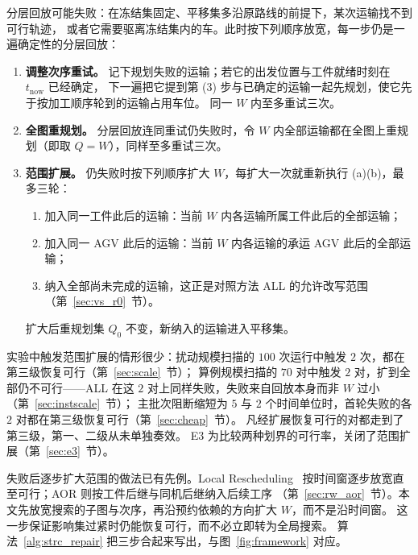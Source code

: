 \documentclass[manuscript,screen,review]{acmart}
\newcommand{\ScalePairs}{70}
\begin{document}
分层回放可能失败：在冻结集固定、平移集多沿原路线的前提下，某次运输找不到可行轨迹，
或者它需要驱离冻结集内的车。此时按下列顺序放宽，每一步仍是一遍确定性的分层回放：
\begin{enumerate}[label=(\alph*),leftmargin=2em,itemsep=0.15em]
\item \textbf{调整次序重试。} 记下规划失败的运输；若它的出发位置与工件就绪时刻在 \(t_{\mathrm{now}}\) 已经确定，
下一遍把它提到第 (3) 步与已确定的运输一起先规划，使它先于按加工顺序轮到的运输占用车位。
同一 \(W\) 内至多重试三次。
\item \textbf{全图重规划。} 分层回放连同重试仍失败时，令 \(W\) 内全部运输都在全图上重规划（即取 \(Q=W\)），同样至多重试三次。
\item \textbf{范围扩展。} 仍失败时按下列顺序扩大 \(W\)，每扩大一次就重新执行 (a)(b)，最多三轮：
\begin{enumerate}[label=(\roman*),leftmargin=1.6em,itemsep=0.1em]
\item 加入同一工件此后的运输：当前 \(W\) 内各运输所属工件此后的全部运输；
\item 加入同一 AGV 此后的运输：当前 \(W\) 内各运输的承运 AGV 此后的全部运输；
\item 纳入全部尚未完成的运输，这正是对照方法 ALL 的允许改写范围（第~\ref{sec:vs_r0}~节）。
\end{enumerate}
扩大后重规划集 \(Q_0\) 不变，新纳入的运输进入平移集。
\end{enumerate}
实验中触发范围扩展的情形很少：扰动规模扫描的 \(100\) 次运行中触发 \(2\) 次，都在第三级恢复可行（第~\ref{sec:scale}~节）；
算例规模扫描的 \(\ScalePairs\) 对中触发 \(2\) 对，扩到全部仍不可行——ALL 在这 \(2\) 对上同样失败，失败来自回放本身而非 \(W\) 过小（第~\ref{sec:instscale}~节）；
主批次阻断缩短为 \(5\) 与 \(2\) 个时间单位时，首轮失败的各 \(2\) 对都在第三级恢复可行（第~\ref{sec:cheap}~节）。
凡经扩展恢复可行的对都走到了第三级，第一、二级从未单独奏效。
E3 为比较两种划界的可行率，关闭了范围扩展（第~\ref{sec:e3}~节）。

失败后逐步扩大范围的做法已有先例。Local Rescheduling~\cite{kuster2007local}
按时间窗逐步放宽直至可行；AOR 则按工件后继与同机后继纳入后续工序
（第~\ref{sec:rw_aor}~节）。本文先放宽搜索的子图与次序，再沿预约依赖的方向扩大 \(W\)，而不是沿时间窗。
这一步保证影响集过紧时仍能恢复可行，而不必立即转为全局搜索。
算法~\ref{alg:strc_repair} 把三步合起来写出，与图~\ref{fig:framework} 对应。
\end{document}
